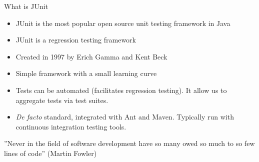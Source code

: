 \documentclass[11pt, xcolor=svgnames]{beamer}
\begin{document}
\begin{frame}{What is JUnit}

  \begin{itemize}
     \item JUnit is the most popular open source unit testing framework in Java
     \item JUnit is a regression testing framework
     \item Created in 1997 by Erich Gamma and Kent Beck
     \item Simple framework with a small learning curve
     \item Tests can be automated (facilitates regression testing). It allow us to aggregate tests via test suites.
     \item \textit{De facto} standard, integrated with Ant and Maven. Typically run with continuous integration testing tools. 
  \end{itemize}



  ''Never in the field of software development have so many owed so much to so few lines of code'' (Martin Fowler)

\end{frame}







\end{document}
